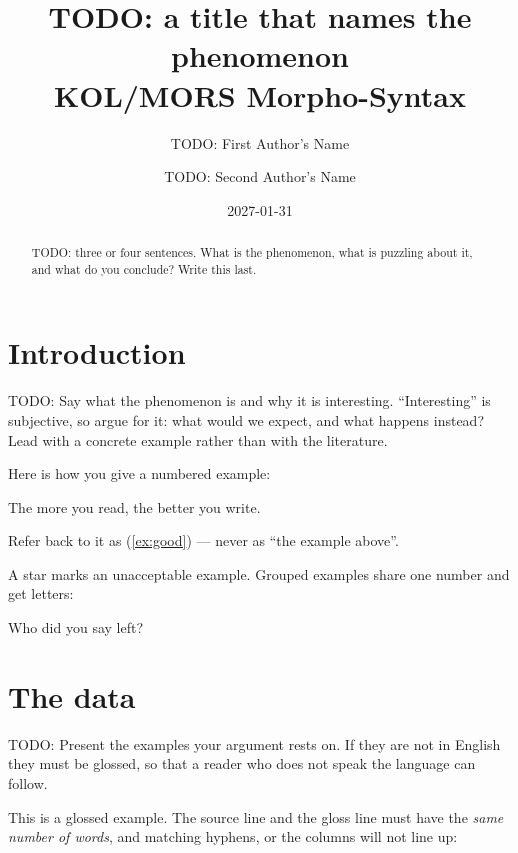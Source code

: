 \documentclass[a4paper,12pt]{article}
\title{TODO: a title that names the phenomenon\\
  \large KOL/MORS Morpho-Syntax}
\author{TODO: First Author's Name \and TODO: Second Author's Name}
\date{2027-01-31}
\begin{document}
\maketitle

\begin{abstract}
  TODO: three or four sentences.  What is the phenomenon, what is
  puzzling about it, and what do you conclude?  Write this last.
\end{abstract}

\section{Introduction}

TODO: Say what the phenomenon is and why it is interesting.
``Interesting'' is subjective, so argue for it: what would we expect,
and what happens instead?  Lead with a concrete example rather than
with the literature.

Here is how you give a numbered example:

\begin{exe}
  \ex \label{ex:good} The more you read, the better you write.
\end{exe}

Refer back to it as (\ref{ex:good}) --- never as ``the example above''.

A star marks an unacceptable example.  Grouped examples share one
number and get letters:

\begin{exe}
  \ex \begin{xlist}
    \ex Who did you say left?
  \end{xlist}
\end{exe}

\section{The data}

TODO: Present the examples your argument rests on.  If they are not in
English they must be glossed, so that a reader who does not speak the
language can follow.

This is a glossed example.  The source line and the gloss line must
have the \emph{same number of words}, and matching hyphens, or the
columns will not line up:
\end{document}
